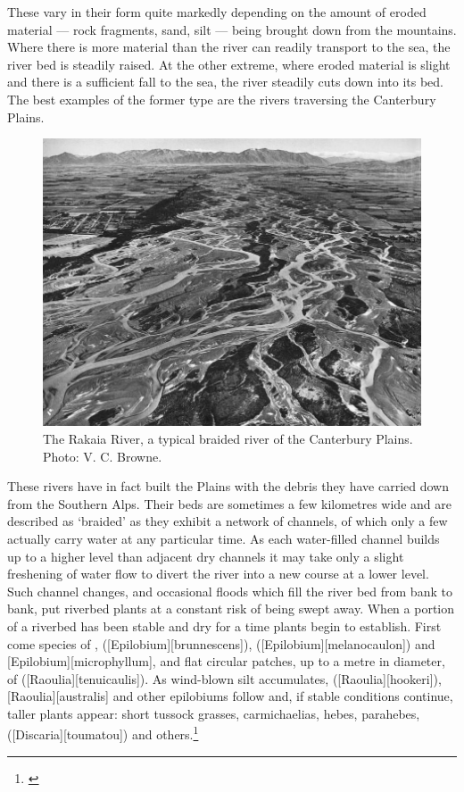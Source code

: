 These vary in their form quite markedly depending on the amount of eroded material --- rock fragments, sand, silt --- being brought down from the mountains.
Where there is more material than the river can readily transport to the sea, the river bed is steadily raised.
At the other extreme, where eroded material is slight and there is a sufficient fall to the sea, the river steadily cuts down into its bed.
The best examples of the former type are the rivers traversing the Canterbury Plains.
\begin{figure}[t]
	\includegraphics[width=\textwidth]{graphics/fig_087}
	\centering
	\caption[The Rakaia River]{The Rakaia River, a typical braided river of the Canterbury Plains.
	Photo: V. C. Browne.}%
	\label{fig:87rakaia}
\end{figure}
These rivers have in fact built the Plains with the debris they have carried down from the Southern Alps.
Their beds are sometimes a few kilometres wide and are described as `braided' as they exhibit a network of channels, of which only a few actually carry water at any particular time.
As each water-filled channel builds up to a higher level than adjacent dry channels it may take only a slight freshening of water flow to divert the river into a new course at a lower level.
Such channel changes, and occasional floods which fill the river bed from bank to bank, put riverbed plants at a constant risk of being swept away.
When a portion of a riverbed has been stable and dry for a time plants begin to establish.
First come species of ,  ([Epilobium][brunnescens]),  ([Epilobium][melanocaulon]) and [Epilobium][microphyllum], and flat circular patches, up to a metre in diameter, of  ([Raoulia][tenuicaulis]).
As wind-blown silt accumulates,  ([Raoulia][hookeri]), [Raoulia][australis] and other epilobiums follow and, if stable conditions continue, taller plants appear: short tussock grasses, carmichaelias, hebes, parahebes,  ([Discaria][toumatou]) and others.\footnote{\cite{calder1961plant}}

